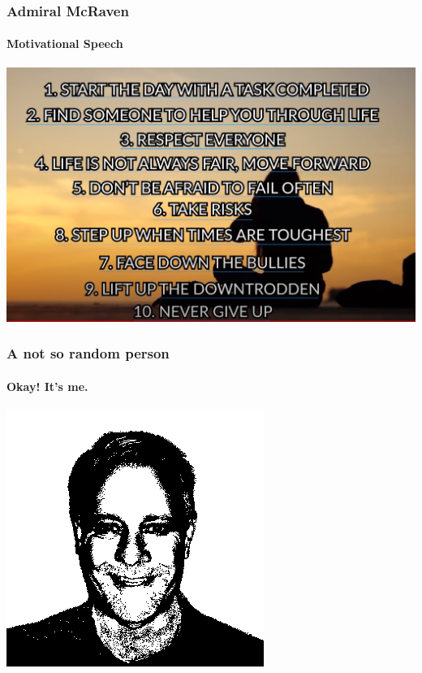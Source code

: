 \documentclass{beamer}
\begin{document}

\begin{frame}
  \frametitle{\hspace{4mm}Admiral McRaven}%
  \framesubtitle{\hspace{4mm}Motivational Speech}%
  \includegraphics[scale=.22]{images/cid-01.png}%
\end{frame}%

\begin{frame}
  \frametitle{\hspace{4mm}A not so random person}%
  \framesubtitle{\hspace{4mm}Okay! It's me.}%
  \includegraphics[scale=.60]{images/cid-02.png}%
\end{frame}%
\end{document}
